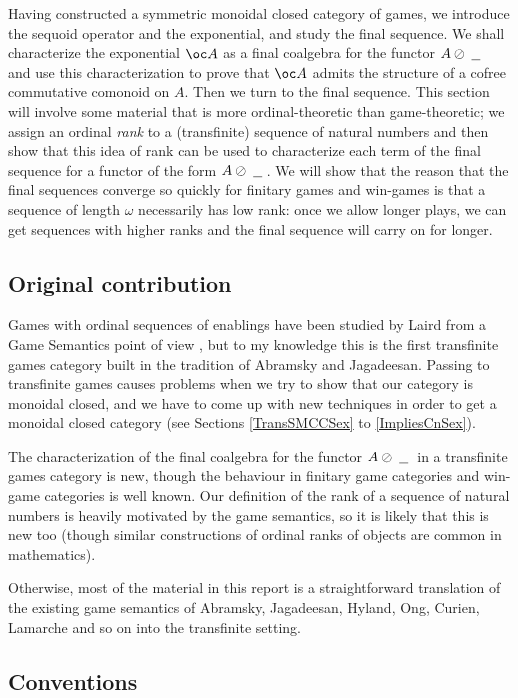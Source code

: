 \documentclass[11pt]{article} %
\theoremstyle{plain} %
\theoremstyle{definition} %
\theoremstyle{note}
\theoremstyle{exercisestyle}
\newcommand{\sequoid}{\oslash}
\newcommand{\blank}{\;\underline{\hspace{1.5ex}}\;}
\begin{document}
Having constructed a symmetric monoidal closed category of games, we introduce the sequoid operator and the exponential, and study the final sequence.  We shall characterize the exponential $\oc A$ as a final coalgebra for the functor $A\sequoid\blank$ and use this characterization to prove that $\oc A$ admits the structure of a cofree commutative comonoid on $A$.  Then we turn to the final sequence.  This section will involve some material that is more ordinal-theoretic than game-theoretic; we assign an ordinal \emph{rank} to a (transfinite) sequence of natural numbers and then show that this idea of rank can be used to characterize each term of the final sequence for a functor of the form $A\sequoid\blank$.  We will show that the reason that the final sequences converge so quickly for finitary games and win-games is that a sequence of length $\omega$ necessarily has low rank: once we allow longer plays, we can get sequences with higher ranks and the final sequence will carry on for longer.  

\subsection{Original contribution}

Games with ordinal sequences of enablings have been studied by Laird from a Game Semantics point of view \cite{LairdOrdinalGames}, but to my knowledge this is the first transfinite games category built in the tradition of Abramsky and Jagadeesan.  Passing to transfinite games causes problems when we try to show that our category is monoidal closed, and we have to come up with new techniques in order to get a monoidal closed category (see Sections \ref{TransSMCCSex} to \ref{ImpliesCnSex}).  

The characterization of the final coalgebra for the functor $A\sequoid\blank$ in a transfinite games category is new, though the behaviour in finitary game categories and win-game categories is well known.  Our definition of the rank of a sequence of natural numbers is heavily motivated by the game semantics, so it is likely that this is new too (though similar constructions of ordinal ranks of objects are common in mathematics).  

Otherwise, most of the material in this report is a straightforward translation of the existing game semantics of Abramsky, Jagadeesan, Hyland, Ong, Curien, Lamarche and so on into the transfinite setting.  

\subsection{Conventions}
\end{document}
